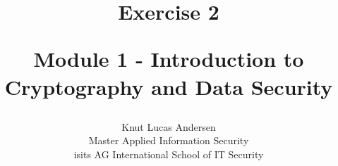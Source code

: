 \title{ 
	\begin{center} \textbf{ Exercise 2 } \end{center}
	\begin{center} {\large Module 1 - Introduction to Cryptography and Data Security } \end{center}
}

\author{ 
	Knut Lucas Andersen \\
	Master Applied Information Security \\
	isits AG International School of IT Security
}